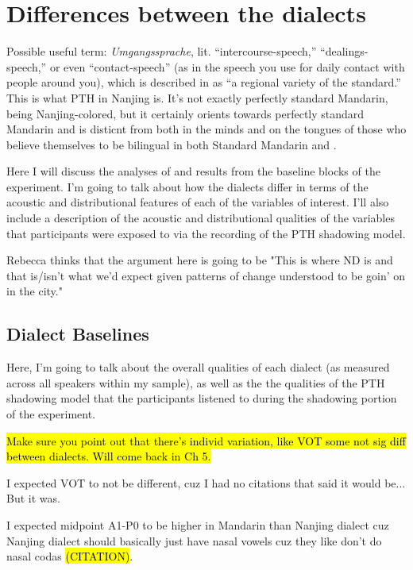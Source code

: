 \chapter{Differences between the dialects}
\label{baselinechapter}

Possible useful term: \textit{Umgangssprache}, lit. ``intercourse-speech,'' ``dealings-speech,'' or even ``contact-speech'' (as in the speech you use for daily contact with people around you), which is described in \citet{hinskens1992dialect} as ``a regional variety of the standard.'' This is what PTH in Nanjing is. It's not exactly perfectly standard Mandarin, being Nanjing-colored, but it certainly orients towards perfectly standard Mandarin and is disticnt from \ND{} both in the minds and on the tongues of those who believe themselves to be bilingual in both Standard Mandarin and \ND{}.

Here I will discuss the analyses of and results from the baseline blocks of the experiment. I'm going to talk about how the dialects differ in terms of the acoustic and distributional features of each of the variables of interest. I'll also include a description of the acoustic and distributional qualities of the variables that participants were exposed to via the recording of the PTH shadowing model.

Rebecca thinks that the argument here is going to be "This is where ND is and that is/isn't what we'd expect given patterns of change understood to be goin' on in the city."

\section{Dialect Baselines}
\label{sec:baselines}

Here, I'm going to talk about the overall qualities of each dialect (as measured across all speakers within my sample), as well as the the qualities of the PTH shadowing model that the participants listened to during the shadowing portion of the experiment. %

\hl{Make sure you point out that there's individ variation, like VOT some not sig diff between dialects. Will come back in Ch 5.}

I expected VOT to not be different, cuz I had no citations that said it would be... But it was.

I expected midpoint A1-P0 to be higher in Mandarin than Nanjing dialect cuz Nanjing dialect should basically just have nasal vowels cuz they like don't do nasal codas \hl{(CITATION)}.

